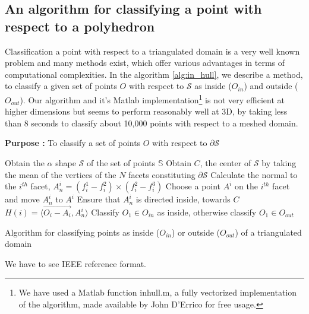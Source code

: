 \documentclass[12pt,a4]{article}
\begin{document}
\subsection{An algorithm for classifying a point with respect to a polyhedron}\label{app:polyhedron_point}
\indent Classification a point with respect to a triangulated domain is a very well known problem and many methods exist, which offer various advantages in terms of computational complexities. In the algorithm \cref{alg:in_hull}, we describe a method, to classify a given set of points $O$ with respect to $\mathcal{S}$ as inside ($O_{in}$) and outside ($O_{out}$). Our algorithm and it's Matlab implementation\footnote{We have used a Matlab function inhull.m, a fully vectorized implementation of the algorithm, made available by John D'Errico for free usage. } is not very efficient at higher dimensions but seems to perform reasonably well at 3D, by taking less than 8 seconds to classify about 10,000 points with respect to a meshed domain. 
\begin{algorithm}[ht!]
	\textbf{Purpose :} To classify a set of points $ O $ with respect to $\partial \mathcal{S}$\\
	\begin{algorithmic}[1]
		\STATE Obtain the $\alpha$ shape $\mathcal{S}$ of the set of points $\mathbb{S}$
		\STATE Obtain $C$, the center of $\mathcal{S}$ by taking the mean of the vertices of the $N$ facets constituting $\partial \mathcal{S}$
		\STATE Calculate the normal to the $i^{th}$ facet, $A_n^i=(f_i^1-f_i^2)\times(f_i^2-f_i^3)$
		\STATE Choose a point $A^i$ on the $i^{th}$ facet and move $A_n^i$ to $A^i$
		\STATE Ensure that $A_n^i$ is directed inside, towards $C$
		\STATE $H(i)=\langle\vec{O_i-A_i}, A_n^i\rangle$
		\ENDFOR 
		\STATE Classify $O_1 \in O_{in}$ as inside, otherwise classify $O_1\in O_{out}$  		\ENDIF
	\end{algorithmic}
	
	\caption{Algorithm for classifying points as inside ($O_{in}$) or outside ($O_{out}$) of a triangulated domain}		
	\label{alg:in_hull}
\end{algorithm}

%


\begin{thebibliography}{99}

We have to see IEEE reference format.
%
%


\end{thebibliography}
\end{document}
